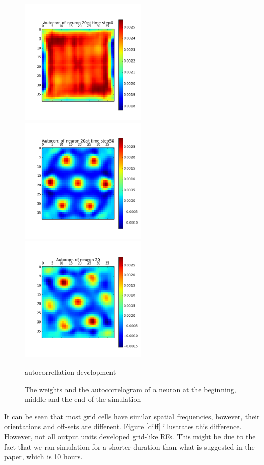 \documentclass[a4paper, 12pt]{article}
\begin{document}
\begin{figure}[htbp]
\begin{minipage}[hbt]{0,49\textwidth}
        \centering
\includegraphics[width=6cm,height=6cm]{neurons/neuron_a_20_t_0.png}\\[10pt]
\includegraphics[width=6cm,height=6cm]{neurons/neuron_a_20_t_50.png}\\[10pt]
\includegraphics[width=6cm,height=6cm]{neurons/neuron_a_20.png}
        \caption{autocorrellation development}
        \label{LabelB}
\end{minipage}
\centering
\caption{The weights and the autocorrelogram of a neuron at the beginning, middle and the end of the simulation}
\label{time-evol}
\end{figure}

It can be seen that most grid cells have similar spatial frequencies, however, their orientations and off-sets are different. Figure \ref{diff} illustrates this difference. However, not all output units developed grid-like RFs. This might be due to the fact that  we ran simulation for a shorter duration than what is suggested in the paper, which is 10 hours.
\end{document}
